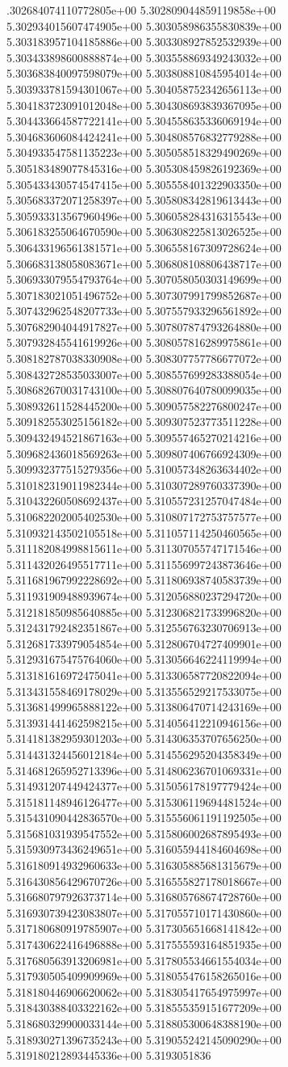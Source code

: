 .302684074110772805e+00	5.302809044859119858e+00	5.302934015607474905e+00	5.303058986355830839e+00	5.303183957104185886e+00	5.303308927852532939e+00	5.303433898600888874e+00	5.303558869349243032e+00	5.303683840097598079e+00	5.303808810845954014e+00	5.303933781594301067e+00	5.304058752342656113e+00	5.304183723091012048e+00	5.304308693839367095e+00	5.304433664587722141e+00	5.304558635336069194e+00	5.304683606084424241e+00	5.304808576832779288e+00	5.304933547581135223e+00	5.305058518329490269e+00	5.305183489077845316e+00	5.305308459826192369e+00	5.305433430574547415e+00	5.305558401322903350e+00	5.305683372071258397e+00	5.305808342819613443e+00	5.305933313567960496e+00	5.306058284316315543e+00	5.306183255064670590e+00	5.306308225813026525e+00	5.306433196561381571e+00	5.306558167309728624e+00	5.306683138058083671e+00	5.306808108806438717e+00	5.306933079554793764e+00	5.307058050303149699e+00	5.307183021051496752e+00	5.307307991799852687e+00	5.307432962548207733e+00	5.307557933296561892e+00	5.307682904044917827e+00	5.307807874793264880e+00	5.307932845541619926e+00	5.308057816289975861e+00	5.308182787038330908e+00	5.308307757786677072e+00	5.308432728535033007e+00	5.308557699283388054e+00	5.308682670031743100e+00	5.308807640780099035e+00	5.308932611528445200e+00	5.309057582276800247e+00	5.309182553025156182e+00	5.309307523773511228e+00	5.309432494521867163e+00	5.309557465270214216e+00	5.309682436018569263e+00	5.309807406766924309e+00	5.309932377515279356e+00	5.310057348263634402e+00	5.310182319011982344e+00	5.310307289760337390e+00	5.310432260508692437e+00	5.310557231257047484e+00	5.310682202005402530e+00	5.310807172753757577e+00	5.310932143502105518e+00	5.311057114250460565e+00	5.311182084998815611e+00	5.311307055747171546e+00	5.311432026495517711e+00	5.311556997243873646e+00	5.311681967992228692e+00	5.311806938740583739e+00	5.311931909488939674e+00	5.312056880237294720e+00	5.312181850985640885e+00	5.312306821733996820e+00	5.312431792482351867e+00	5.312556763230706913e+00	5.312681733979054854e+00	5.312806704727409901e+00	5.312931675475764060e+00	5.313056646224119994e+00	5.313181616972475041e+00	5.313306587720822094e+00	5.313431558469178029e+00	5.313556529217533075e+00	5.313681499965888122e+00	5.313806470714243169e+00	5.313931441462598215e+00	5.314056412210946156e+00	5.314181382959301203e+00	5.314306353707656250e+00	5.314431324456012184e+00	5.314556295204358349e+00	5.314681265952713396e+00	5.314806236701069331e+00	5.314931207449424377e+00	5.315056178197779424e+00	5.315181148946126477e+00	5.315306119694481524e+00	5.315431090442836570e+00	5.315556061191192505e+00	5.315681031939547552e+00	5.315806002687895493e+00	5.315930973436249651e+00	5.316055944184604698e+00	5.316180914932960633e+00	5.316305885681315679e+00	5.316430856429670726e+00	5.316555827178018667e+00	5.316680797926373714e+00	5.316805768674728760e+00	5.316930739423083807e+00	5.317055710171430860e+00	5.317180680919785907e+00	5.317305651668141842e+00	5.317430622416496888e+00	5.317555593164851935e+00	5.317680563913206981e+00	5.317805534661554034e+00	5.317930505409909969e+00	5.318055476158265016e+00	5.318180446906620062e+00	5.318305417654975997e+00	5.318430388403322162e+00	5.318555359151677209e+00	5.318680329900033144e+00	5.318805300648388190e+00	5.318930271396735243e+00	5.319055242145090290e+00	5.319180212893445336e+00	5.3193051836